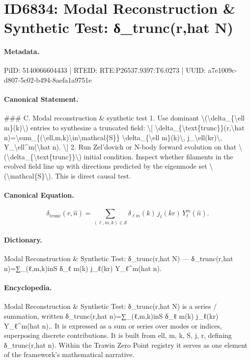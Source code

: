 \section*{ID6834: Modal Reconstruction \& Synthetic Test: δ\_trunc(r,hat N)}
\paragraph{Metadata.}
PiID: 5140066604433 | RTEID: RTE:P26537.9397:T6.0273 | UUID: a7e1009c-d807-5c02-b494-8aefa1a9751e

\paragraph{Canonical Statement.}
\#\#\# C. Modal reconstruction \& synthetic test 1. Use dominant \textbackslash{}(\textbackslash{}delta\_\{\textbackslash{}ell m\}(k)\textbackslash{}) entries to synthesize a truncated field: \textbackslash{}[ \textbackslash{}delta\_\{\textbackslash{}text\{trunc\}\}(r,\textbackslash{}hat n)=\textbackslash{}sum\_\{(\textbackslash{}ell,m,k)\textbackslash{}in\textbackslash{}mathcal\{S\}\} \textbackslash{}delta\_\{\textbackslash{}ell m\}(k)\textbackslash{}, j\_\textbackslash{}ell(kr)\textbackslash{}, Y\_\textbackslash{}ell\textasciicircum{}m(\textbackslash{}hat n). \textbackslash{}] 2. Run Zel’dovich or N-body forward evolution on that \textbackslash{}(\textbackslash{}delta\_\{\textbackslash{}text\{trunc\}\}\textbackslash{}) initial condition. Inspect whether filaments in the evolved field line up with directions predicted by the eigenmode set \textbackslash{}(\textbackslash{}mathcal\{S\}\textbackslash{}). This is direct causal test.

\paragraph{Canonical Equation.}
\[
\delta_{\text{trunc}}(r,\hat n)=\sum_{(\ell,m,k)\in\mathcal{S}} \delta_{\ell m}(k)\, j_\ell(kr)\, Y_\ell^m(\hat n).
\]

\paragraph{Dictionary.}
Modal Reconstruction \& Synthetic Test: δ\_trunc(r,hat N) — δ\_trunc(r,hat n)=∑\_(ℓ,m,k)inS δ\_ℓ m(k) j\_ℓ(kr) Y\_ℓ\textasciicircum{}m(hat n).

\paragraph{Encyclopedia.}
Modal Reconstruction \& Synthetic Test: δ\_trunc(r,hat N) is a series / summation, written δ\_trunc(r,hat n)=∑\_(ℓ,m,k)inS δ\_ℓ m(k) j\_ℓ(kr) Y\_ℓ\textasciicircum{}m(hat n).. It is expressed as a sum or series over modes or indices, superposing discrete contributions. It is built from ell, m, k, S, j, r, defining δ\_trunc(r,hat n). Within the Trawin Zero Point registry it serves as one element of the framework's mathematical narrative.
